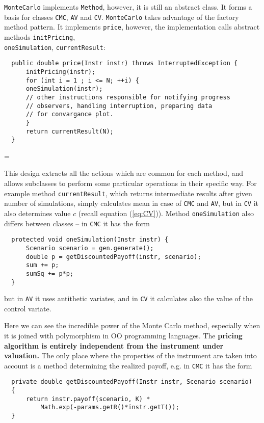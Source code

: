 \documentclass[a4paper,11pt, twoside]{book}
\newenvironment{absolutelynopagebreak}
  {\par\nobreak\vfill\penalty0\vfilneg
   \vtop\bgroup}
  {\par\xdef\tpd{\the\prevdepth}\egroup
   \prevdepth=\tpd}
\theoremstyle{definition}
\theoremstyle{remark}
\newcounter{example}[chapter]
\begin{document}
\texttt{MonteCarlo} implements \texttt{Method}, however, it is still an abstract class. It forms a basis for classes \texttt{CMC}, \texttt{AV} and \texttt{CV}. \texttt{MonteCarlo} takes advantage of the factory method pattern. It implements \texttt{price}, however, the implementation calls abstract methods \texttt{initPricing},\\ \texttt{oneSimulation}, \texttt{currentResult}:
\begin{absolutelynopagebreak}
\begin{lstlisting}
  public double price(Instr instr) throws InterruptedException {
      initPricing(instr);
      for (int i = 1 ; i <= N; ++i) {
	  oneSimulation(instr);
	  // other instructions responsible for notifying progress
	  // observers, handling interruption, preparing data
	  // for convargance plot.
      }
      return currentResult(N);
  }
\end{lstlisting}
\end{absolutelynopagebreak}
   
This design extracts all the actions which are common for each method, and allows subclasses to perform some particular operations in their specific way. For example method \texttt{currentResult}, which returns intermediate results after given number of simulations, simply calculates mean in case of \texttt{CMC} and \texttt{AV}, but in \texttt{CV} it also determines value $c$ (recall equation (\ref{eq:CV})). Method \texttt{oneSimulation} also differs between classes -- in \texttt{CMC} it has the form

\begin{lstlisting}
  protected void oneSimulation(Instr instr) {
      Scenario scenario = gen.generate();
      double p = getDiscountedPayoff(instr, scenario);
      sum += p;
      sumSq += p*p;
  }
\end{lstlisting}
but in \texttt{AV} it uses antithetic variates, and in \texttt{CV} it calculates also the value of the control variate.

Here we can see the incredible power of the Monte Carlo method, especially when it is joined with polymorphism in OO programming languages. The \textbf{pricing algorithm is entirely independent from the instrument under valuation.} The only place where the properties of the instrument are taken into account is a method determining the realized payoff, e.g. in \texttt{CMC} it has the form

\begin{lstlisting}
  private double getDiscountedPayoff(Instr instr, Scenario scenario)
  { 
      return instr.payoff(scenario, K) *
	      Math.exp(-params.getR()*instr.getT());
  }
\end{lstlisting}
\end{document}

